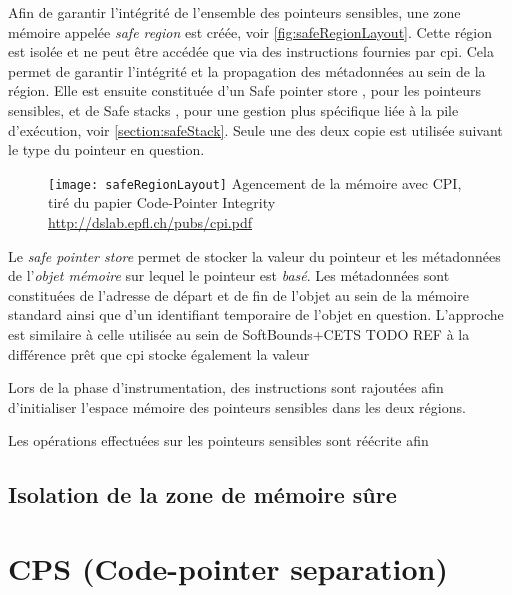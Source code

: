 Afin de garantir l'intégrité de l'ensemble des pointeurs sensibles, une zone mémoire appelée \textit{safe region} est créée, voir \autoref{fig:safeRegionLayout}. Cette région est isolée et ne peut être accédée que via des instructions fournies par \gls{cpi}. Cela permet de garantir l'intégrité et la propagation des métadonnées au sein de la région. Elle est ensuite constituée d'un \og Safe pointer store \fg, pour les pointeurs sensibles, et de \og Safe stacks \fg, pour une gestion plus spécifique liée à la pile d'exécution, voir \autoref{section:safeStack}. Seule une des deux copie est utilisée suivant le type du pointeur en question.

\begin{figure}[H]
	\centering
	\texttt{[image: safeRegionLayout]}
	{Agencement de la mémoire avec CPI, tiré du papier Code-Pointer Integrity}
	{\url{http://dslab.epfl.ch/pubs/cpi.pdf}}
	\label{fig:safeRegionLayout}
\end{figure}

Le \textit{safe pointer store} permet de stocker la valeur du pointeur et les métadonnées de l'\textit{objet mémoire} sur lequel le pointeur est \textit{basé}. Les métadonnées sont constituées de l'adresse de départ et de fin de l'objet au sein de la mémoire standard ainsi que d'un identifiant temporaire de l'objet en question. L'approche est similaire à celle utilisée au sein de SoftBounds+CETS TODO REF à la différence prêt que \gls{cpi} stocke également la valeur



Lors de la phase d'instrumentation, des instructions sont rajoutées afin d'initialiser l'espace mémoire des pointeurs sensibles dans les deux régions.


 Les opérations effectuées sur les pointeurs sensibles sont réécrite afin

\subsection{Isolation de la zone de mémoire sûre}

\section{CPS (Code-pointer separation)}

